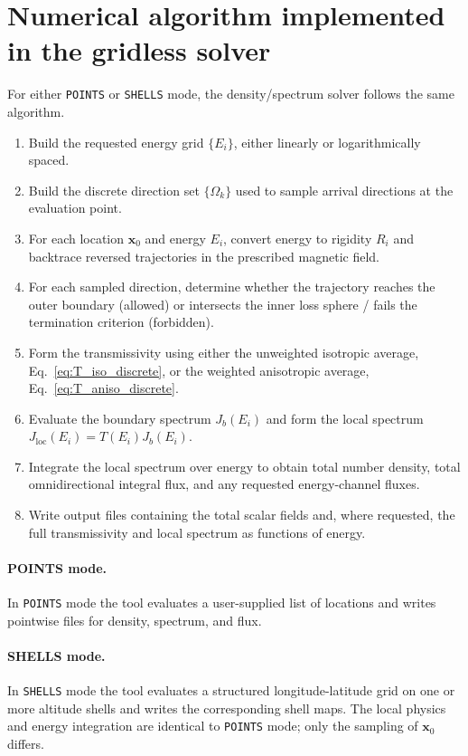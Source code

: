\documentclass[11pt]{article}
\begin{document}
\section{Numerical algorithm implemented in the gridless solver}
For either \texttt{POINTS} or \texttt{SHELLS} mode, the density/spectrum solver
follows the same algorithm.

\begin{enumerate}
  \item Build the requested energy grid $\{E_i\}$, either linearly or
        logarithmically spaced.
  \item Build the discrete direction set $\{\Omega_k\}$ used to sample arrival
        directions at the evaluation point.
  \item For each location $\bm{x}_0$ and energy $E_i$, convert energy to rigidity
        $R_i$ and backtrace reversed trajectories in the prescribed magnetic field.
  \item For each sampled direction, determine whether the trajectory reaches the
        outer boundary (allowed) or intersects the inner loss sphere / fails the
        termination criterion (forbidden).
  \item Form the transmissivity using either the unweighted isotropic average,
        Eq.~\eqref{eq:T_iso_discrete}, or the weighted anisotropic average,
        Eq.~\eqref{eq:T_aniso_discrete}.
  \item Evaluate the boundary spectrum $J_b(E_i)$ and form the local spectrum
        $J_{\mathrm{loc}}(E_i)=T(E_i)J_b(E_i)$.
  \item Integrate the local spectrum over energy to obtain total number density,
        total omnidirectional integral flux, and any requested energy-channel fluxes.
  \item Write output files containing the total scalar fields and, where requested,
        the full transmissivity and local spectrum as functions of energy.
\end{enumerate}

\paragraph{POINTS mode.}
In \texttt{POINTS} mode the tool evaluates a user-supplied list of locations and
writes pointwise files for density, spectrum, and flux.

\paragraph{SHELLS mode.}
In \texttt{SHELLS} mode the tool evaluates a structured longitude-latitude grid on
one or more altitude shells and writes the corresponding shell maps. The local
physics and energy integration are identical to \texttt{POINTS} mode; only the
sampling of $\bm{x}_0$ differs.
\end{document}
